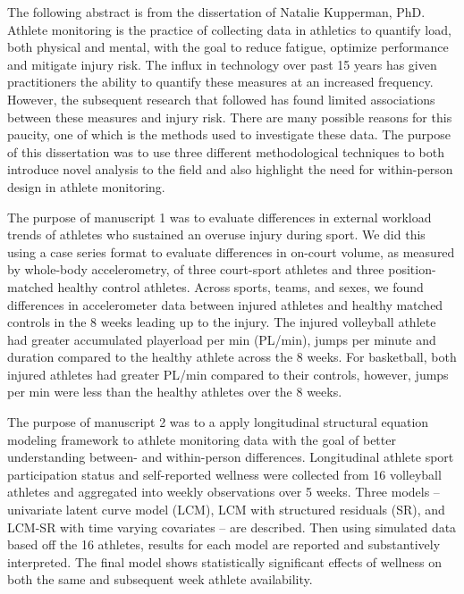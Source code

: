The following abstract is from the dissertation of Natalie Kupperman, PhD.  Athlete monitoring is the practice of collecting data in athletics to quantify load, both physical and mental, with the goal to reduce fatigue, optimize performance and mitigate injury risk. The influx in technology over past 15 years has given practitioners the ability to quantify these measures at an increased frequency. However, the subsequent research that followed has found limited associations between these measures and injury risk. There are many possible reasons for this paucity, one of which is the methods used to investigate these data. The purpose of this dissertation was to use three different methodological techniques to both introduce novel analysis to the field and also highlight the need for within-person design in athlete monitoring.

The purpose of manuscript 1 was to evaluate differences in external workload trends of athletes who sustained an overuse injury during sport. We did this using a case series format to evaluate differences in on-court volume, as measured by whole-body accelerometry, of three court-sport athletes and three position-matched healthy control athletes. Across sports, teams, and sexes, we found differences in accelerometer data between injured athletes and healthy matched controls in the 8 weeks leading up to the injury. The injured volleyball athlete had greater accumulated playerload per min (PL/min), jumps per minute and duration compared to the healthy athlete across the 8 weeks. For basketball, both injured athletes had greater PL/min compared to their controls, however, jumps per min were less than the healthy athletes over the 8 weeks.

The purpose of manuscript 2 was to a apply longitudinal structural equation modeling framework to athlete monitoring data with the goal of better understanding between- and within-person differences. Longitudinal athlete sport participation status and self-reported wellness were collected from 16 volleyball athletes and aggregated into weekly observations over 5 weeks. Three models – univariate latent curve model (LCM), LCM with structured residuals (SR), and LCM-SR with time varying covariates – are described. Then using simulated data based off the 16 athletes, results for each model are reported and substantively interpreted. The final model shows statistically significant effects of wellness on both the same and subsequent week athlete availability.

